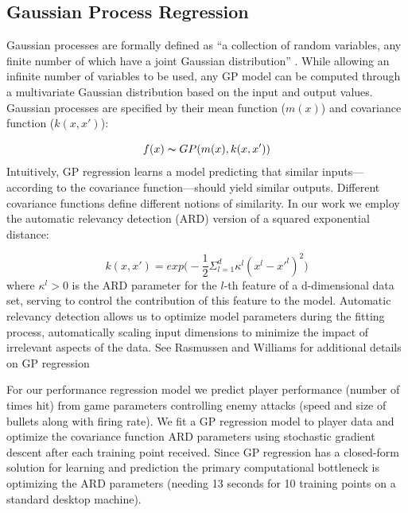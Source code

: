 \documentclass{sig-alternate}
\begin{document}
\subsection{Gaussian Process Regression}

Gaussian processes are formally defined as ``a collection of random variables, any finite number of which have a joint Gaussian distribution'' \cite{rasmussen2006}. While allowing an infinite number of variables to be used, any GP model can be computed through a multivariate Gaussian distribution based on the input and output values. Gaussian processes are specified by their mean function ($m(x)$) and covariance function ($k(x,x')$):

$$ f(x) \thicksim GP( m(x), k(x,x') ) $$
Intuitively, GP regression learns a model predicting that similar inputs---according to the covariance function---should yield similar outputs. Different covariance functions define different notions of similarity. In our work we employ the automatic relevancy detection (ARD) version of a squared exponential distance:

$$ k(x,x') = exp\big( -\frac{1}{2} \Sigma_{l=1}^{d} \kappa^{l} (x^{l} - x'^{l})^2 \big) $$
where $\kappa^{l} > 0$ is the ARD parameter for the $l$-th feature of a {d}-dimensional data set, serving to control the contribution of this feature to the model. Automatic relevancy detection allows us to optimize model parameters during the fitting process, automatically scaling input dimensions to minimize the impact of irrelevant aspects of the data. 
See Rasmussen and Williams  for additional details on GP regression

For our performance regression model we predict player performance (number of times hit) from game parameters controlling enemy attacks (speed and size of bullets along with firing rate). We fit a GP regression model to player data and optimize the covariance function ARD parameters using stochastic gradient descent after each training point received. Since GP regression has a closed-form solution for learning and prediction the primary computational bottleneck is optimizing the ARD parameters (needing 13 seconds for 10 training points on a standard desktop machine).
\end{document}
